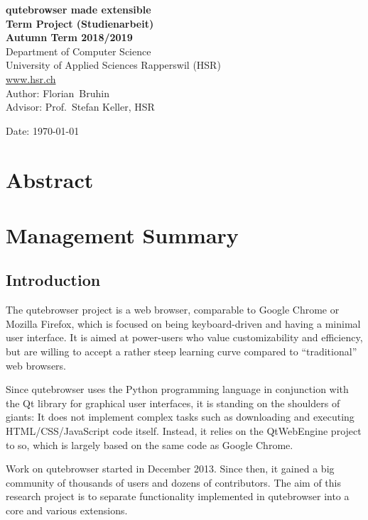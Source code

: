 \documentclass[a4paper,parskip=full]{scrreprt}
\begin{document}
\begin{titlepage}
\begin{flushleft}
{\huge \bfseries qutebrowser made extensible}\\[0.5cm]
{\large \bfseries Term Project (Studienarbeit) \\[0.2cm] Autumn Term 2018/2019}\\[2cm]

Department of Computer Science\\
University of Applied Sciences Rapperswil (HSR)\\
\url{www.hsr.ch}\\[1cm]

Author: Florian~Bruhin\\[0.3cm]
Advisor: Prof.~Stefan Keller, HSR

\vfill
Date: {\today}

\end{flushleft}

\end{titlepage}



\chapter*{Abstract}

\chapter*{Management Summary}
\section*{Introduction}
The qutebrowser project is a web browser, comparable to Google Chrome or Mozilla
Firefox, which is focused on being keyboard-driven and having a minimal user
interface. It is aimed at power-users who value customizability and efficiency,
but are willing to accept a rather steep learning curve compared to
``traditional'' web browsers.

Since qutebrowser uses the Python programming language in conjunction with the
Qt library for graphical user interfaces, it is standing on the shoulders of
giants: It does not implement complex tasks such as downloading and executing
HTML/CSS/JavaScript code itself. Instead, it relies on the QtWebEngine project
to so, which is largely based on the same code as Google Chrome.

Work on qutebrowser started in December 2013. Since then, it gained a big
community of thousands of users and dozens of contributors. The aim of this
research project is to separate functionality implemented in qutebrowser into a
core and various extensions.
\end{document}
